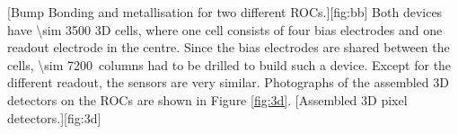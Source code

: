 [Bump Bonding and metallisation for two different \acp{ROC}.][fig:bb]
Both devices have \SI{\sim 3500}{} 3D cells, where one cell consists of four bias electrodes and one readout electrode in the centre. Since the bias electrodes are shared between the cells, \SI{\sim 7200}{columns} had to be drilled to build such a device. Except for the different readout, the sensors are very similar. Photographs of the assembled 3D detectors on the \acp{ROC} are shown in Figure \ref{fig:3d}. 
[Assembled 3D pixel detectors.][fig:3d]